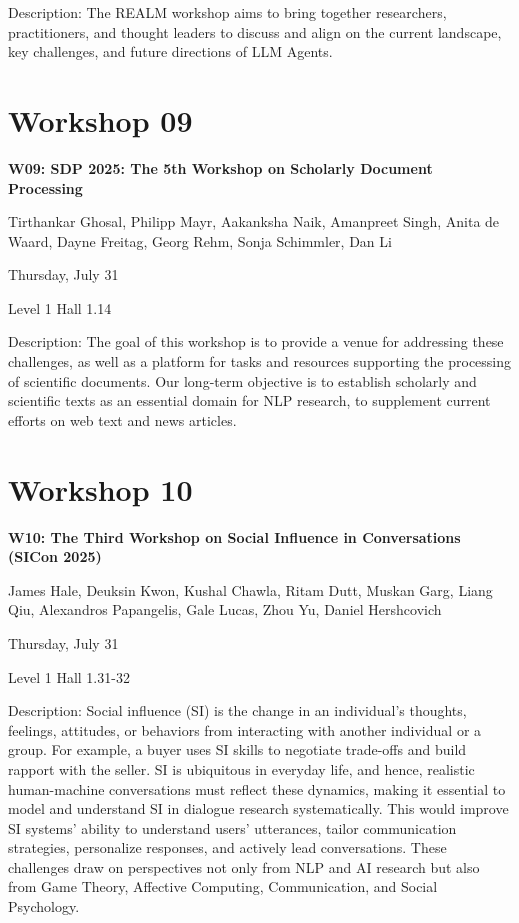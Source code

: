 Description: The REALM workshop aims to bring together researchers, practitioners, and thought leaders to discuss and align on the current landscape, key challenges, and future directions of LLM Agents.


\clearpage


\section[W09: SDP 2025: The 5th Workshop on Scholarly Document Processing]{Workshop 09}

\begin{center}
    {\Large \textbf{W09: SDP 2025: The 5th Workshop on Scholarly Document Processing}}

    Tirthankar Ghosal, Philipp Mayr, Aakanksha Naik, Amanpreet Singh, Anita de Waard, Dayne Freitag, Georg Rehm, Sonja Schimmler, Dan Li

    Thursday, July 31
    
    Level 1 Hall 1.14

\end{center}

Description: The goal of this workshop is to provide a venue for addressing these challenges, as well as a platform for tasks and resources supporting the processing of scientific documents. Our long-term objective is to establish scholarly and scientific texts as an essential domain for NLP research, to supplement current efforts on web text and news articles.

\clearpage


\section[W10: The Third Workshop on Social Influence in Conversations (SICon 2025)]{Workshop 10}

\begin{center}
    {\Large \textbf{W10: The Third Workshop on Social Influence in Conversations (SICon 2025)}}

    James Hale, Deuksin Kwon, Kushal Chawla, Ritam Dutt, Muskan Garg, Liang Qiu, Alexandros Papangelis, Gale Lucas, Zhou Yu, Daniel Hershcovich

   Thursday, July 31
    
    Level 1 Hall 1.31-32

\end{center}
	
Description: Social influence (SI) is the change in an individual's thoughts, feelings, attitudes, or behaviors from interacting with another individual or a group. For example, a buyer uses SI skills to negotiate trade-offs and build rapport with the seller. SI is ubiquitous in everyday life, and hence, realistic human-machine conversations must reflect these dynamics, making it essential to model and understand SI in dialogue research systematically. This would improve SI systems' ability to understand users’ utterances, tailor communication strategies, personalize responses, and actively lead conversations. These challenges draw on perspectives not only from NLP and AI research but also from Game Theory, Affective Computing, Communication, and Social Psychology.


